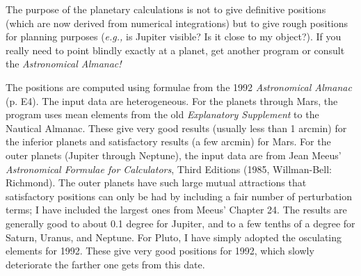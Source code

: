 
The purpose of the planetary calculations is not to give definitive
positions (which are now derived from numerical integrations) but
to give rough positions for planning purposes ({\it e.g.,} is Jupiter 
visible?  Is it close to my object?).  If you really need to point 
blindly exactly at a planet, get another program or consult the 
{\it Astronomical Almanac!}

The positions are computed using formulae from the 1992 {\it Astronomical
Almanac} (p. E4).  The input data are heterogeneous.  For the planets 
through Mars, the program uses mean elements from the old 
{\it Explanatory Supplement\/} to the Nautical Almanac.  These give very 
good results (usually less than 1 arcmin) for the inferior planets and 
satisfactory results (a few arcmin) for Mars.  For the outer planets 
(Jupiter through Neptune), the input data are from Jean Meeus' 
{\it Astronomical Formulae for Calculators}, Third Editions (1985, 
Willman-Bell: Richmond).  The outer planets have such large mutual 
attractions that satisfactory positions can only be had by including a 
fair number of perturbation terms; I have included the largest ones from 
Meeus' Chapter 24.   The results are generally good to about 0.1 degree 
for Jupiter, and to a few tenths of a degree for Saturn, Uranus, and Neptune.
For Pluto, I have simply adopted the osculating elements for 1992.  These 
give very good positions for 1992, which slowly deteriorate the farther one 
gets from this date.

